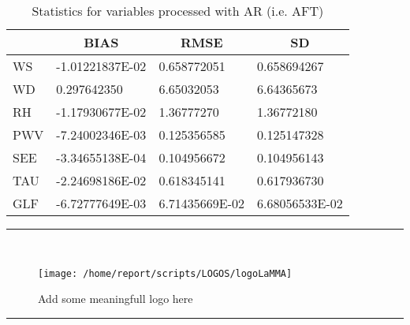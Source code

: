 \documentclass[11pt,english]{article}
\newcommand{\HRule}{\rule{\linewidth}{0.5mm}}
\begin{document}
\begin{table}[]
\begin{center}
\begin{tabular}{|l|l|l|l|}
\hline
                            & \multicolumn{1}{c|}{\cellcolor[HTML]{C0C0C0}\textbf{BIAS}} & \multicolumn{1}{c|}{\cellcolor[HTML]{C0C0C0}\textbf{RMSE}} & \multicolumn{1}{c|}{\cellcolor[HTML]{C0C0C0}\textbf{SD}} \\\hline
\cellcolor[HTML]{C0C0C0}WS  &   -1.01221837E-02                                &   0.658772051                                    &   0.658694267                                    \\
\cellcolor[HTML]{C0C0C0}WD  &   0.297642350                                    &    6.65032053                                    &    6.64365673                                    \\
\cellcolor[HTML]{C0C0C0}RH  &   -1.17930677E-02                                &    1.36777270                                    &    1.36772180                                    \\
\cellcolor[HTML]{C0C0C0}PWV &   -7.24002346E-03                               &   0.125356585                                   &   0.125147328                                   \\
\cellcolor[HTML]{C0C0C0}SEE &   -3.34655138E-04                               &   0.104956672                                   &   0.104956143                                   \\
\cellcolor[HTML]{C0C0C0}TAU &   -2.24698186E-02                               &   0.618345141                                   &   0.617936730                                   \\
\cellcolor[HTML]{C0C0C0}GLF &   -6.72777649E-03                               &    6.71435669E-02                               &    6.68056533E-02                               \\
\hline
\end{tabular}
\caption{Statistics for variables processed with AR (i.e. AFT)}
\end{center}
\end{table}

\clearpage

\begin{center}
\HRule \\[0.4cm]
\begin{figure}[htbp]
\centering
{\texttt{[image: /home/report/scripts/LOGOS/logoLaMMA]}}
\caption{Add some meaningfull logo here}
\end{figure}
\HRule \\[0.4cm]
\end{center}
\end{document}

